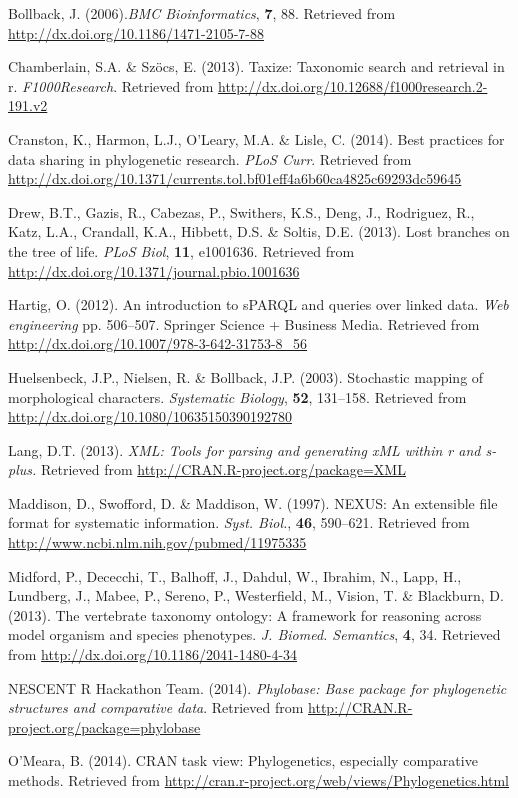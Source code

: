 \documentclass[author-year, review, 11pt]{components/elsarticle} %
\begin{document}
Bollback, J. (2006).\emph{BMC Bioinformatics}, \textbf{7}, 88. Retrieved
from \url{http://dx.doi.org/10.1186/1471-2105-7-88}

Chamberlain, S.A. \& Sz{ö}cs, E. (2013). Taxize: Taxonomic search and
retrieval in r. \emph{F1000Research}. Retrieved from
\url{http://dx.doi.org/10.12688/f1000research.2-191.v2}

Cranston, K., Harmon, L.J., O'Leary, M.A. \& Lisle, C. (2014). Best
practices for data sharing in phylogenetic research. \emph{PLoS Curr}.
Retrieved from
\url{http://dx.doi.org/10.1371/currents.tol.bf01eff4a6b60ca4825c69293dc59645}

Drew, B.T., Gazis, R., Cabezas, P., Swithers, K.S., Deng, J., Rodriguez,
R., Katz, L.A., Crandall, K.A., Hibbett, D.S. \& Soltis, D.E. (2013).
Lost branches on the tree of life. \emph{PLoS Biol}, \textbf{11},
e1001636. Retrieved from
\url{http://dx.doi.org/10.1371/journal.pbio.1001636}

Hartig, O. (2012). An introduction to sPARQL and queries over linked
data. \emph{Web engineering} pp. 506--507. Springer Science + Business
Media. Retrieved from
\url{http://dx.doi.org/10.1007/978-3-642-31753-8_56}

Huelsenbeck, J.P., Nielsen, R. \& Bollback, J.P. (2003). Stochastic
mapping of morphological characters. \emph{Systematic Biology},
\textbf{52}, 131--158. Retrieved from
\url{http://dx.doi.org/10.1080/10635150390192780}

Lang, D.T. (2013). \emph{XML: Tools for parsing and generating xML
within r and s-plus.} Retrieved from
\url{http://CRAN.R-project.org/package=XML}

Maddison, D., Swofford, D. \& Maddison, W. (1997). NEXUS: An extensible
file format for systematic information. \emph{Syst. Biol.}, \textbf{46},
590--621. Retrieved from
\url{http://www.ncbi.nlm.nih.gov/pubmed/11975335}

Midford, P., Dececchi, T., Balhoff, J., Dahdul, W., Ibrahim, N., Lapp,
H., Lundberg, J., Mabee, P., Sereno, P., Westerfield, M., Vision, T. \&
Blackburn, D. (2013). The vertebrate taxonomy ontology: A framework for
reasoning across model organism and species phenotypes. \emph{J. Biomed.
Semantics}, \textbf{4}, 34. Retrieved from
\url{http://dx.doi.org/10.1186/2041-1480-4-34}

NESCENT R Hackathon Team. (2014). \emph{Phylobase: Base package for
phylogenetic structures and comparative data}. Retrieved from
\url{http://CRAN.R-project.org/package=phylobase}

O'Meara, B. (2014). CRAN task view: Phylogenetics, especially
comparative methods. Retrieved from
\url{http://cran.r-project.org/web/views/Phylogenetics.html}
\end{document}
